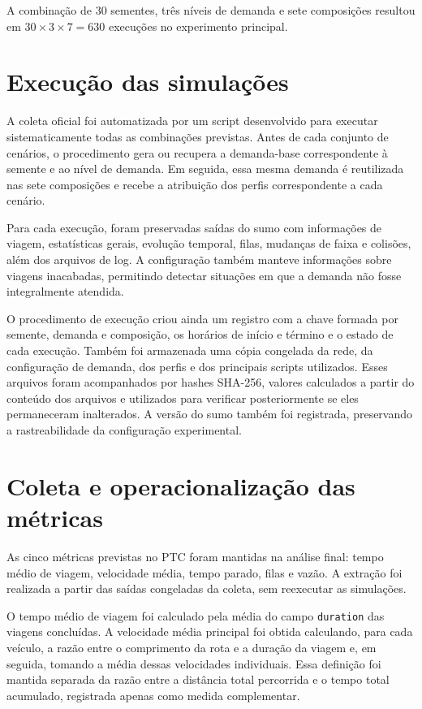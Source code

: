 A combinação de 30 sementes, três níveis de demanda e sete composições resultou em \(30 \times 3 \times 7 = 630\) execuções no experimento principal.

\section{Execução das simulações}

A coleta oficial foi automatizada por um script desenvolvido para executar sistematicamente todas as combinações previstas. Antes de cada conjunto de cenários, o procedimento gera ou recupera a demanda-base correspondente à semente e ao nível de demanda. Em seguida, essa mesma demanda é reutilizada nas sete composições e recebe a atribuição dos perfis correspondente a cada cenário.

Para cada execução, foram preservadas saídas do \gls{sumo} com informações de viagem, estatísticas gerais, evolução temporal, filas, mudanças de faixa e colisões, além dos arquivos de log. A configuração também manteve informações sobre viagens inacabadas, permitindo detectar situações em que a demanda não fosse integralmente atendida.

O procedimento de execução criou ainda um registro com a chave formada por semente, demanda e composição, os horários de início e término e o estado de cada execução. Também foi armazenada uma cópia congelada da rede, da configuração de demanda, dos perfis e dos principais scripts utilizados. Esses arquivos foram acompanhados por hashes SHA-256, valores calculados a partir do conteúdo dos arquivos e utilizados para verificar posteriormente se eles permaneceram inalterados. A versão do \gls{sumo} também foi registrada, preservando a rastreabilidade da configuração experimental.

\section{Coleta e operacionalização das métricas}

As cinco métricas previstas no PTC foram mantidas na análise final: tempo médio de viagem, velocidade média, tempo parado, filas e vazão. A extração foi realizada a partir das saídas congeladas da coleta, sem reexecutar as simulações.

O tempo médio de viagem foi calculado pela média do campo \texttt{duration} das viagens concluídas. A velocidade média principal foi obtida calculando, para cada veículo, a razão entre o comprimento da rota e a duração da viagem e, em seguida, tomando a média dessas velocidades individuais. Essa definição foi mantida separada da razão entre a distância total percorrida e o tempo total acumulado, registrada apenas como medida complementar.

